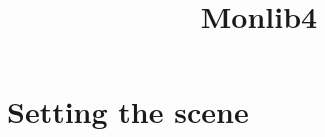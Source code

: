 \documentclass{report}
\title{Monlib4}
\begin{document}
\maketitle

\section{Setting the scene}

\end{document}
